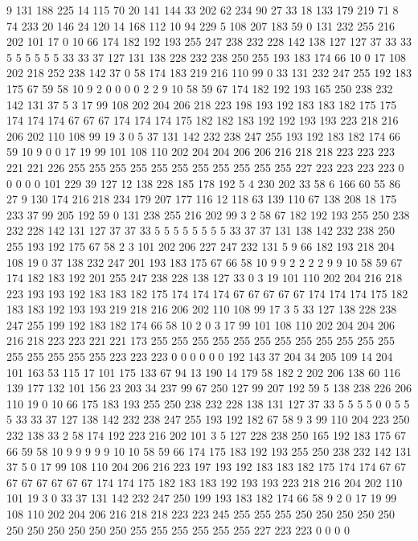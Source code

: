 9 131 188 225 14 115 70 20 141 144 33 202 62 234 90 27 33 18 133 179
219 71 8 74 233 20 146 24 120 14 168 112 10 94 229 5 108 207 183 59
0 131 232 255 216 202 101 17 0 10 66 174 182 192 193 255 247 238 232 228
142 138 127 127 37 33 33 5 5 5 5 5 5 33 33 37 127 131 138 228
232 238 250 255 193 183 174 66 10 0 17 108 202 218 252 238 142 37 0 58
174 183 219 216 110 99 0 33 131 232 247 255 192 183 175 67 59 58 10 9
2 0 0 0 0 2 2 9 10 58 59 67 174 182 192 193 165 250 238 232
142 131 37 5 3 17 99 108 202 204 206 218 223 198 193 192 183 183 182 175
175 174 174 174 67 67 67 174 174 174 175 182 182 183 192 192 193 193 223 218
216 206 202 110 108 99 19 3 0 5 37 131 142 232 238 247 255 193 192 183
182 174 66 59 10 9 0 0 17 19 99 101 108 110 202 204 204 206 206 216
218 218 223 223 223 221 221 226 255 255 255 255 255 255 255 255 255 255 255 227
223 223 223 223 0 0 0 0 0 101 229 39 127 12 138 228 185 178 192 5
4 230 202 33 58 6 166 60 55 86 27 9 130 174 216 218 234 179 207 177
116 12 118 63 139 110 67 138 208 18 175 233 37 99 205 192 59 0 131 238
255 216 202 99 3 2 58 67 182 192 193 255 250 238 232 228 142 131 127 37
37 33 5 5 5 5 5 5 5 5 33 37 37 131 138 142 232 238 250 255
193 192 175 67 58 2 3 101 202 206 227 247 232 131 5 9 66 182 193 218
204 108 19 0 37 138 232 247 201 193 183 175 67 66 58 10 9 9 2 2
2 2 9 9 10 58 59 67 174 182 183 192 201 255 247 238 228 138 127 33
0 3 19 101 110 202 204 216 218 223 193 193 192 183 183 182 175 174 174 174
67 67 67 67 67 174 174 174 175 182 183 183 192 193 193 219 218 216 206 202
110 108 99 17 3 5 33 127 138 228 238 247 255 199 192 183 182 174 66 58
10 2 0 3 17 99 101 108 110 202 204 204 206 216 218 223 223 221 221 173
255 255 255 255 255 255 255 255 255 255 255 255 255 255 255 255 255 223 223 223
0 0 0 0 0 0 192 143 37 204 34 205 109 14 204 101 163 53 115 17
101 175 133 67 94 13 190 14 179 58 182 2 202 206 138 60 116 139 177 132
101 156 23 203 34 237 99 67 250 127 99 207 192 59 5 138 238 226 206 110
19 0 10 66 175 183 193 255 250 238 232 228 138 131 127 37 33 5 5 5
5 0 0 5 5 5 33 33 37 127 138 142 232 238 247 255 193 192 182 67
58 9 3 99 110 204 223 250 232 138 33 2 58 174 192 223 216 202 101 3
5 127 228 238 250 165 192 183 175 67 66 59 58 10 9 9 9 9 9 10
10 58 59 66 174 175 183 192 193 255 250 238 232 142 131 37 5 0 17 99
108 110 204 206 216 223 197 193 192 183 183 182 175 174 174 67 67 67 67 67
67 67 67 174 174 175 182 183 183 192 193 193 223 218 216 204 202 110 101 19
3 0 33 37 131 142 232 247 250 199 193 183 182 174 66 58 9 2 0 17
19 99 108 110 202 204 206 216 218 218 223 223 245 255 255 255 250 250 250 250
250 250 250 250 250 250 250 255 255 255 255 255 255 227 223 223 0 0 0 0

